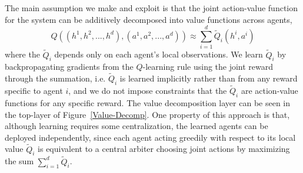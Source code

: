 \documentclass{article}
\begin{document}
\begin{SCfigure}
\iffalse
\begin{figure*}[htp]
  \centering
  \subfigure[Independent Agents Architecture]{\texttt{[image: \{pg\_0002]}}\quad
  \subfigure[Value-Decomposition Individual Architecture]{\texttt{[image: \{decomposed\_cropped]}}
\end{figure*}
\fi










The main assumption we make and exploit is that the joint action-value function for the system can be additively decomposed into value functions across agents,
$$Q((h^1,h^2,...,h^d),(a^1,a^2,...,a^d))\approx \sum_{i=1}^d \tilde Q_i(h^i,a^i)\label{Qsum}
$$where the $\tilde Q_i$ depends only on each agent's local observations. We learn $\tilde Q_i$ by backpropagating gradients from the $Q$-learning rule using the joint reward through the summation, i.e. $\tilde Q_i$ is learned implicitly rather than from any reward specific to agent $i$, and we do not impose constraints that the $\tilde Q_i$ are action-value functions for any specific reward. The value decomposition layer can be seen in the top-layer of Figure~\ref{Value-Decomp}. One property of this approach is that, although learning requires some centralization, the learned agents can be deployed independently, since each agent acting greedily with respect to its local value $\tilde Q_i$ is equivalent to a central arbiter choosing joint actions by maximizing the sum $\sum_{i=1}^d \tilde Q_i$.





\end{SCfigure}
\end{document}
